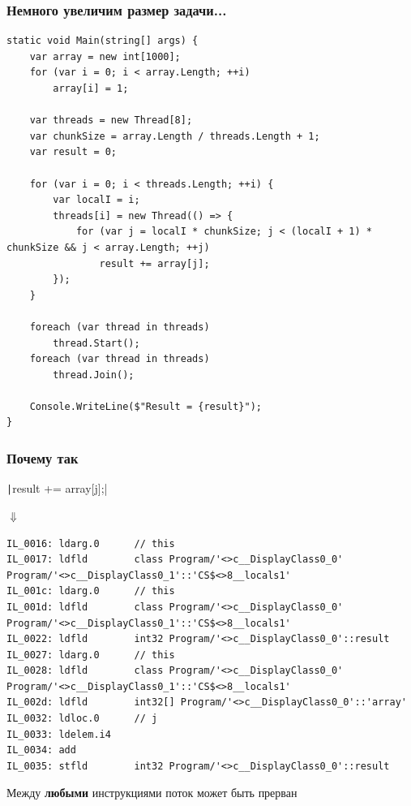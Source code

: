 \documentclass[xetex,mathserif,serif]{beamer}
\begin{document}
	\begin{frame}[fragile]
		\frametitle{Немного увеличим размер задачи...}
		\begin{ssmall}
			\begin{verbatim}
static void Main(string[] args) {
    var array = new int[1000];
    for (var i = 0; i < array.Length; ++i)
        array[i] = 1;

    var threads = new Thread[8];
    var chunkSize = array.Length / threads.Length + 1;
    var result = 0;

    for (var i = 0; i < threads.Length; ++i) {
        var localI = i;
        threads[i] = new Thread(() => {
            for (var j = localI * chunkSize; j < (localI + 1) * chunkSize && j < array.Length; ++j)
                result += array[j];
        });
    }

    foreach (var thread in threads)
        thread.Start();
    foreach (var thread in threads)
        thread.Join();

    Console.WriteLine($"Result = {result}");
}
			\end{verbatim}
		\end{ssmall}
	\end{frame}

	\begin{frame}[fragile]
		\frametitle{Почему так}
		\texttt|result += array[j];|

		\hspace{13mm}$\Downarrow$

		\begin{ssmall}
			\begin{verbatim}
IL_0016: ldarg.0      // this
IL_0017: ldfld        class Program/'<>c__DisplayClass0_0' Program/'<>c__DisplayClass0_1'::'CS$<>8__locals1'
IL_001c: ldarg.0      // this
IL_001d: ldfld        class Program/'<>c__DisplayClass0_0' Program/'<>c__DisplayClass0_1'::'CS$<>8__locals1'
IL_0022: ldfld        int32 Program/'<>c__DisplayClass0_0'::result
IL_0027: ldarg.0      // this
IL_0028: ldfld        class Program/'<>c__DisplayClass0_0' Program/'<>c__DisplayClass0_1'::'CS$<>8__locals1'
IL_002d: ldfld        int32[] Program/'<>c__DisplayClass0_0'::'array'
IL_0032: ldloc.0      // j
IL_0033: ldelem.i4    
IL_0034: add          
IL_0035: stfld        int32 Program/'<>c__DisplayClass0_0'::result
			\end{verbatim}
		\end{ssmall}
		\vspace{5mm}
		Между \textbf{любыми} инструкциями поток может быть прерван
	\end{frame}
\end{document}
